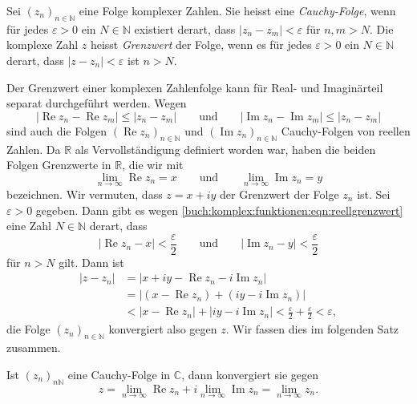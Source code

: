 \begin{definition}[Grenzwert]
%
Sei $(z_n)_{n\in\mathbb{N}}$ eine Folge komplexer Zahlen.
Sie heisst eine \emph{Cauchy-Folge}, wenn für jedes $\varepsilon>0$ ein
$N\in\mathbb{N}$ existiert derart, dass $|z_n-z_m|< \varepsilon$ 
für $n,m>N$.
Die komplexe Zahl $z$ heisst \emph{Grenzwert} der Folge, wenn es für
jedes $\varepsilon>0$ ein $N\in\mathbb{N}$ derart, dass $|z-z_n|<\varepsilon$
ist $n>N$.
\end{definition}

Der Grenzwert einer komplexen Zahlenfolge kann für Real- und Imaginärteil
separat durchgeführt werden.
Wegen
\[
|\operatorname{Re}z_n - \operatorname{Re}z_m| \le |z_n-z_m|
\qquad\text{und}\qquad
|\operatorname{Im}z_n - \operatorname{Im}z_m| \le |z_n-z_m|
\]
sind auch die Folgen $(\operatorname{Re}z_n)_{n\in\mathbb{N}}$
und $(\operatorname{Im}z_n)_{n\in\mathbb{N}}$ Cauchy-Folgen
von reellen Zahlen.
Da $\mathbb{R}$ als Vervollständigung definiert worden war, haben
die beiden Folgen Grenzwerte in $\mathbb{R}$, die wir mit
\begin{equation}
\lim_{n\to\infty}\operatorname{Re}z_n = x
\qquad\text{und}\qquad
\lim_{n\to\infty}\operatorname{Im}z_n = y
\label{buch:komplex:funktionen:eqn:reellgrenzwert}
\end{equation}
bezeichnen.
Wir vermuten, dass $z=x+iy$ der Grenzwert der Folge $z_n$ ist.
Sei $\varepsilon>0$ gegeben.
Dann gibt es wegen
\eqref{buch:komplex:funktionen:eqn:reellgrenzwert}
eine Zahl $N\in\mathbb{N}$ derart, dass
\[
|\operatorname{Re}z_n-x|<\frac{\varepsilon}{2}
\qquad\text{und}\qquad
|\operatorname{Im}z_n-y|<\frac{\varepsilon}{2}
\]
für $n>N$ gilt.
Dann ist
\begin{align*}
|z-z_n|
&=
|x+iy-\operatorname{Re}z_n -i\operatorname{Im}z_n|
\\
&=
|
(x -\operatorname{Re}z_n)
+
(iy -i\operatorname{Im}z_n)
|
\\
&<
|x -\operatorname{Re}z_n|
+
|iy -i\operatorname{Im}z_n|
<
\frac{\varepsilon}2
+
\frac{\varepsilon}2
<
\varepsilon,
\end{align*}
die Folge $(z_n)_{n\in\mathbb{N}}$ konvergiert also gegen $z$.
Wir fassen dies im folgenden Satz zusammen.

\begin{satz}
Ist $(z_n)_{n\mathbb{N}}$ eine Cauchy-Folge in $\mathbb{C}$, dann konvergiert
sie gegen
\[
z
=
\lim_{n\to \infty} \operatorname{Re}z_n
+
i
\lim_{n\to \infty} \operatorname{Im}z_n
=
\lim_{n\to\infty}z_n.
\]
\end{satz}

